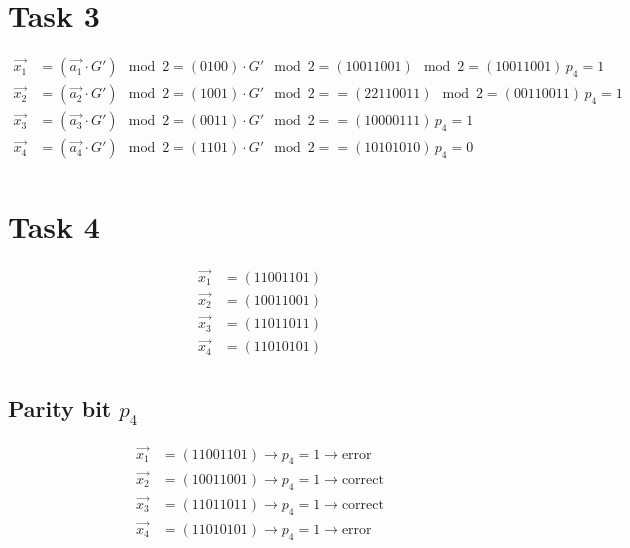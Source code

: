 \section*{Task 3}
\begin{align*}
  \vec{x_1} & = (\vec{a_1} \cdot G') \mod 2 = (0100) \cdot G' \mod 2 = (1 0 0 1 1 0 0 1) \mod 2 = (1 0 0 1 1 0 0 1) \,  p_4 = 1\\
  \vec{x_2} & = (\vec{a_2} \cdot G') \mod 2= (1001) \cdot G' \mod 2 = = (22110011) \mod 2 = (00110011) \, p_4 = 1                \\
  \vec{x_3} & = (\vec{a_3} \cdot G') \mod 2 = (0011) \cdot G' \mod 2 = = (10000111) \, p_4 = 1                                                            \\
  \vec{x_4} & = (\vec{a_4} \cdot G') \mod 2 = (1101) \cdot G' \mod 2 = = (10101010)  \, p_4 = 0                                                            \\
\end{align*}

\section*{Task 4}
\begin{align*}
  \vec{x_1} & = (1 1 0 0 1 1 0 1)\\
  \vec{x_2} & = (1 0 0 1 1 0 0 1)           \\
  \vec{x_3} & = (1 1 0 1 1 0 1 1)                                                          \\
  \vec{x_4} & = (1 1 0 1 0 1 0 1)                                                         \\
\end{align*}

\subsection*{Parity bit $p_4$}
\begin{align*}
  \vec{x_1} & = (1 1 0 0 1 1 0 1) \rightarrow p_4 = 1 \rightarrow \text{error}\\
  \vec{x_2} & = (1 0 0 1 1 0 0 1)  \rightarrow p_4 = 1 \rightarrow \text{correct}         \\
  \vec{x_3} & = (1 1 0 1 1 0 1 1)  \rightarrow p_4 = 1 \rightarrow \text{correct}                                                        \\
  \vec{x_4} & = (1 1 0 1 0 1 0 1)   \rightarrow p_4 = 1 \rightarrow \text{error}                                                      \\
\end{align*}

